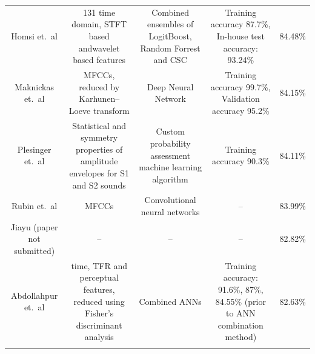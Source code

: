 \documentclass[titlepage, 12pt]{scrartcl} \usepackage{enumitem}
\newcommand{\dbottomrule}{\specialrule{1pt}{0pt}{1.4pt}%
            \specialrule{1pt}{0pt}{\belowrulesep}%
            }
\begin{document}
\begin{landscape}
\begin{table}[H]
\begin{tabulary}{\linewidth}{CCCCC}
Homsi et.~al \citeyearpar{Homsi2017}             & 131 time domain, STFT based andwavelet based features                           & Combined ensembles of LogitBoost, Random Forrest and CSC & Training accuracy 87.7\%, In-house test accuracy: 93.24\%                                            & 84.48\%         \\
Maknickas et.~al \citeyearpar{Maknikas2017}      & MFCCs, reduced by Karhunen–Loeve transform                                      & Deep Neural Network                                      & Training accuracy 99.7\%, Validation accuracy 95.2\%                                                 & 84.15\%         \\
Plesinger et.~al \citeyearpar{Plesinger2017}     & Statistical and symmetry properties of amplitude envelopes for S1 and S2 sounds & Custom probability assessment machine learning algorithm  & Training accuracy 90.3\%                                                                             & 84.11\%         \\
Rubin et.~al \citeyearpar{Rubin2016}             & MFCCs                                                                           & Convolutional neural networks                            & --                                                                                                   & 83.99\%         \\
Jiayu (paper not submitted)                      & --                                                                              & --                                                       & --                                                                                                   & 82.82\%         \\
Abdollahpur et.~al \citeyearpar{Abdolahpur2017} & time, TFR and perceptual features, reduced using Fisher's discriminant analysis & Combined ANNs                                            & Training accuracy: 91.6\%, 87\%, 84.55\% (prior to ANN combination method)                           & 82.63\%\\
\dbottomrule\\

\end{tabulary}
\end{table}
\end{landscape}
\restoregeometry
\doublespacing
\end{document}
